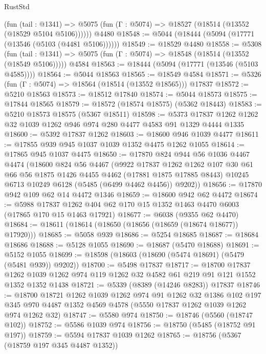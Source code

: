 \begin{lexlean}{RustStd}
\begin{coremodule}
      (fun (tail : @1341) =>
      @5075 (fun (Γ : @5074) => @18527 (@18514 (@13552 (@18529 @5104 @5106))))))
    @4480
@18548 := @5044 (@18444 (@5094 (@17771 (@13546 (@5103 (@4481 @5106))))))
@18549 := @18529 @4480
@18558 := @5308
    (fun (tail : @1341) => @5075 (fun (Γ : @5074) => @18548 (@18514 (@13552 (@18549 @5106)))))
    @4584
@18563 := @18444 (@5094 (@17771 (@13546 (@5103 @4585))))
@18564 := @5044 @18563
@18565 := @18549 @4584
@18571 := @5326 (fun (Γ : @5074) => @18564 (@18514 (@13552 @18565))) @17837
@18572 := @5210 @18563
@18573 := @18512 @17840
@18574 := @5044 @18573
@18575 := @17844 @18565
@18579 := @18572 (@18574 @18575) (@5362 @18443)
@18583 := @5210 @18573 @18575 (@5367 @18511)
@18598 := @5373 @17837 @1262 @1262 @32 @1039 @1262 @946 @974 @280 @4477 @4583 @91 @1329 @4444 @1335
@18600 := @5392 @17837 @1262
@18603 := @18600 @946 @1039 @4477
@18611 := @17855 @939 @945 @1037 @1039 @1352 @4475 @1262 @1055
@18614 := @17865 @945 @1037 @4475
@18650 := @17870
    @824
    @944
    @56
    @1036
    @4467
    @4474
    (@18600
      @824
      @56
      @4467
      (@9922
        @17837
        @1262
        @1262
        @107
        @30
        @61
        @66
        @56
        @1875
        @1426
        @4455
        @4462
        (@17881 @1875 @17885 @8443)
        @10245
        @6713
        @10249
        @6128
        (@5485 (@6499 @4462 @4456))
        @9202))
@18656 := @17870 @942 @109 @62 @14 @4472 @1346
@18659 := @18600 @942 @62 @4472
@18674 := @5988
    @17837
    @1262
    @404
    @62
    @170
    @15
    @1352
    @1463
    @4470
    @6003
    (@17865 @170 @15 @1463 @17921)
@18677 := @6038 (@9355 @62 @4470)
@18684 := @18611 (@18614 (@18650 (@18656 (@18659 (@18674 @18677)) @17920)))
@18685 := @5058 @939
@18686 := @5254 @18685
@18687 := @18684 @18686
@18688 := @5128 @1055
@18690 := @18687 (@5470 @18688)
@18691 := @5152 @1055
@18699 := @18598 (@18603 (@18690 (@5474 @18691) (@5479 (@5481 @939)) @9202))
@18700 := @5498 @17837
@18717 := @18700
    @17837
    @1262
    @1039
    @1262
    @974
    @119
    @1262
    @32
    @4582
    @61
    @219
    @91
    @121
    @1552
    @1352
    @1352
    @1438
@18721 := @5339 (@8389 (@14246 @8283)) @17837
@18746 := @18700
    @18721
    @1262
    @1039
    @1262
    @974
    @91
    @1262
    @32
    @1386
    @102
    @197
    @345
    @970
    @4487
    @1352
    @4569
    @4578
    (@5550 @17837 @1262 @1039 @1262 @974 @1262 @32)
@18747 := @5580 @974
@18750 := @18746 (@5560 (@18747 @102))
@18752 := @5586 @1039 @974
@18756 := @18750 (@5485 (@18752 @91 @197))
@18759 := @5594 @17837 @1039 @1262
@18765 := @18756 (@5367 (@18759 @197 @345 @4487 @1352))

\end{coremodule}
\end{lexlean}
